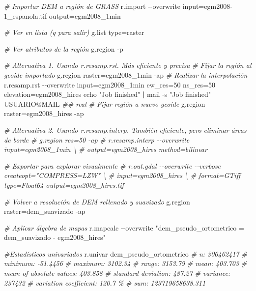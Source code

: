 \documentclass[spanish]{article}
\newenvironment{Shaded}{\begin{snugshade}}{\end{snugshade}}
\newcommand{\AttributeTok}[1]{\textcolor[rgb]{0.77,0.63,0.00}{#1}}
\newcommand{\BuiltInTok}[1]{#1}
\newcommand{\CommentTok}[1]{\textcolor[rgb]{0.56,0.35,0.01}{\textit{#1}}}
\newcommand{\ExtensionTok}[1]{#1}
\newcommand{\KeywordTok}[1]{\textcolor[rgb]{0.13,0.29,0.53}{\textbf{#1}}}
\newcommand{\NormalTok}[1]{#1}
\newcommand{\StringTok}[1]{\textcolor[rgb]{0.31,0.60,0.02}{#1}}
\begin{document}
\begin{Shaded}
\begin{Highlighting}[]
\CommentTok{\# Importar DEM a región de GRASS}
\ExtensionTok{r.import} \AttributeTok{{-}{-}overwrite}\NormalTok{ input=egm2008{-}1\_espanola.tif output=egm2008\_1min}

\CommentTok{\# Ver en lista (q para salir)}
\ExtensionTok{g.list}\NormalTok{ type=raster}

\CommentTok{\# Ver atributos de la región}
\ExtensionTok{g.region} \AttributeTok{{-}p}

\CommentTok{\# Alternativa 1. Usando r.resamp.rst. Más eficiente y precisa}
\CommentTok{\# Fijar la región al geoide importado}
\ExtensionTok{g.region}\NormalTok{ raster=egm2008\_1min }\AttributeTok{{-}ap}
\CommentTok{\# Realizar la interpolación}
\ExtensionTok{r.resamp.rst} \AttributeTok{{-}{-}overwrite}\NormalTok{ input=egm2008\_1min ew\_res=50 ns\_res=50 elevation=egm2008\_hires}
\BuiltInTok{echo} \StringTok{"Job finished"} \KeywordTok{|} \ExtensionTok{mail} \AttributeTok{{-}s} \StringTok{"Job finished"}\NormalTok{ USUARIO@MAIL}
\CommentTok{\#\# real }
\CommentTok{\# Fijar región a nuevo geoide}
\ExtensionTok{g.region}\NormalTok{ raster=egm2008\_hires }\AttributeTok{{-}ap}

\CommentTok{\# Alternativa 2. Usando r.resamp.interp. También eficiente, pero eliminar áreas de borde}
\CommentTok{\# g.region res=50 {-}ap}
\CommentTok{\# r.resamp.interp {-}{-}overwrite input=egm2008\_1min \textbackslash{}}
\CommentTok{\#  output=egm2008\_hires method=bilinear}

\CommentTok{\# Exportar para explorar visualmente}
\CommentTok{\# r.out.gdal {-}{-}overwrite {-}{-}verbose createopt="COMPRESS=LZW" \textbackslash{}}
\CommentTok{\#  input=egm2008\_hires \textbackslash{}}
\CommentTok{\#  format=GTiff type=Float64 output=egm2008\_hires.tif}

\CommentTok{\# Volver a resolución de DEM rellenado y suavizado}
\ExtensionTok{g.region}\NormalTok{ raster=dem\_suavizado }\AttributeTok{{-}ap}

\CommentTok{\# Aplicar álgebra de mapas}
\ExtensionTok{r.mapcalc} \AttributeTok{{-}{-}overwrite} \StringTok{"dem\_pseudo\_ortometrico = dem\_suavizado {-} egm2008\_hires"}

\CommentTok{\#Estadísticos univariados}
\ExtensionTok{r.univar}\NormalTok{ dem\_pseudo\_ortometrico}
\CommentTok{\# n: 306462417}
\CommentTok{\# minimum: {-}51.4456}
\CommentTok{\# maximum: 3102.34}
\CommentTok{\# range: 3153.79}
\CommentTok{\# mean: 403.703}
\CommentTok{\# mean of absolute values: 403.858}
\CommentTok{\# standard deviation: 487.27}
\CommentTok{\# variance: 237432}
\CommentTok{\# variation coefficient: 120.7 \%}
\CommentTok{\# sum: 123719658638.311}
\end{Highlighting}
\end{Shaded}
\end{document}
